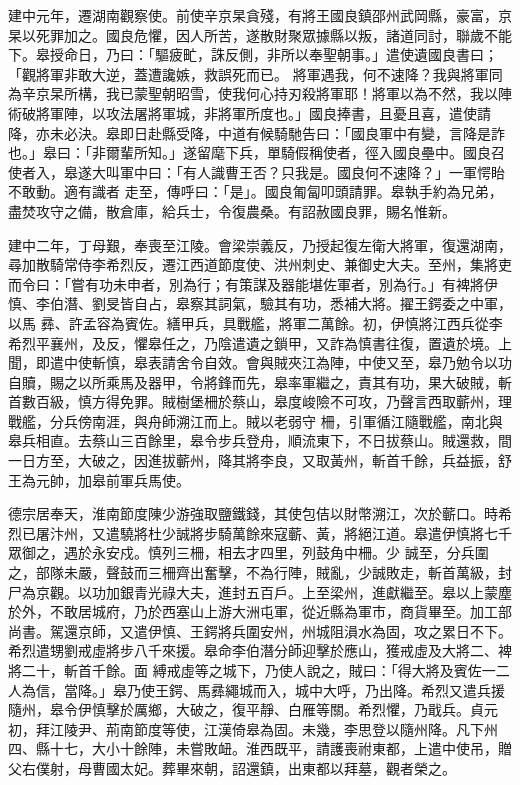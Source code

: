 \begin{pinyinscope}
 建中元年，遷湖南觀察使。前使辛京杲貪殘，有將王國良鎮邵州武岡縣，豪富，京杲以死罪加之。國良危懼，因人所苦，遂散財聚眾據縣以叛，諸道同討，聯歲不能下。皋授命日，乃曰：「驅疲甿，誅反側，非所以奉聖朝事。」遣使遺國良書曰；「觀將軍非敢大逆，蓋遭讒嫉，救誤死而已。
 將軍遇我，何不速降？我與將軍同為辛京杲所構，我已蒙聖朝昭雪，使我何心持刃殺將軍耶！將軍以為不然，我以陣術破將軍陣，以攻法屠將軍城，非將軍所度也。」國良捧書，且憂且喜，遣使請降，亦未必決。皋即日赴縣受降，中道有候騎馳告曰：「國良軍中有變，言降是詐也。」皋曰：「非爾輩所知。」遂留麾下兵，單騎假稱使者，徑入國良壘中。國良召使者入，皋遂大叫軍中曰：「有人識曹王否？只我是。國良何不速降？」一軍愕眙不敢動。適有識者
 走至，傳呼曰：「是」。國良匍匐叩頭請罪。皋執手約為兄弟，盡焚攻守之備，散倉庫，給兵士，令復農桑。有詔赦國良罪，賜名惟新。



 建中二年，丁母艱，奉喪至江陵。會梁崇義反，乃授起復左衛大將軍，復還湖南，尋加散騎常侍李希烈反，遷江西道節度使、洪州刺史、兼御史大夫。至州，集將吏而令曰：「嘗有功未申者，別為行；有策謀及器能堪佐軍者，別為行。」有裨將伊慎、李伯潛、劉旻皆自占，皋察其詞氣，驗其有功，悉補大將。擢王鍔委之中軍，以馬
 彞、許孟容為賓佐。繕甲兵，具戰艦，將軍二萬餘。初，伊慎將江西兵從李希烈平襄州，及反，懼皋任之，乃陰遣遺之鎖甲，又詐為慎書往復，置遺於境。上聞，即遣中使斬慎，皋表請舍令自效。會與賊夾江為陣，中使又至，皋乃勉令以功自贖，賜之以所乘馬及器甲，令將鋒而先，皋率軍繼之，責其有功，果大破賊，斬首數百級，慎方得免罪。賊樹堡柵於蔡山，皋度峻險不可攻，乃聲言西取蘄州，理戰艦，分兵傍南涯，與舟師溯江而上。賊以老弱守
 柵，引軍循江隨戰艦，南北與皋兵相直。去蔡山三百餘里，皋令步兵登舟，順流東下，不日拔蔡山。賊還救，間一日方至，大破之，因進拔蘄州，降其將李良，又取黃州，斬首千餘，兵益振，舒王為元帥，加皋前軍兵馬使。



 德宗居奉天，淮南節度陳少游強取鹽鐵錢，其使包佶以財幣溯江，次於蘄口。時希烈已屠汴州，又遣驍將杜少誠將步騎萬餘來寇蘄、黃，將絕江道。皋遣伊慎將七千眾御之，遇於永安戍。慎列三柵，相去才四里，列鼓角中柵。少
 誠至，分兵圍之，部隊未嚴，聲鼓而三柵齊出奮擊，不為行陣，賊亂，少誠敗走，斬首萬級，封尸為京觀。以功加銀青光祿大夫，進封五百戶。上至梁州，進獻繼至。皋以上蒙塵於外，不敢居城府，乃於西塞山上游大洲屯軍，從近縣為軍市，商貨畢至。加工部尚書。駕還京師，又遣伊慎、王鍔將兵圍安州，州城阻溳水為固，攻之累日不下。希烈遣甥劉戒虛將步八千來援。皋命李伯潛分師迎擊於應山，獲戒虛及大將二、裨將二十，斬首千餘。面
 縛戒虛等之城下，乃使人說之，賊曰：「得大將及賓佐一二人為信，當降。」皋乃使王鍔、馬彞繩城而入，城中大呼，乃出降。希烈又遣兵援隨州，皋令伊慎擊於厲鄉，大破之，復平靜、白雁等關。希烈懼，乃戢兵。貞元初，拜江陵尹、荊南節度等使，江漢倚皋為固。未幾，李思登以隨州降。凡下州四、縣十七，大小十餘陣，未嘗敗衄。淮西既平，請護喪祔東都，上遣中使吊，贈父右僕射，母曹國太妃。葬畢來朝，詔還鎮，出東都以拜墓，觀者榮之。




\end{pinyinscope}
